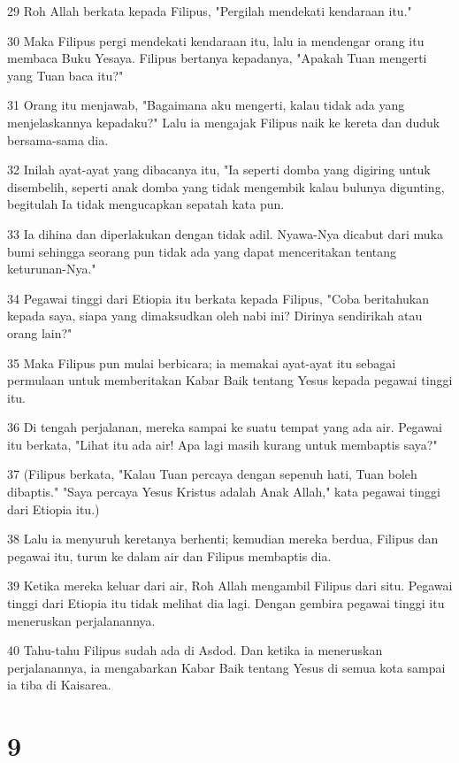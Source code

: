 \par 29 Roh Allah berkata kepada Filipus, "Pergilah mendekati kendaraan itu."
\par 30 Maka Filipus pergi mendekati kendaraan itu, lalu ia mendengar orang itu membaca Buku Yesaya. Filipus bertanya kepadanya, "Apakah Tuan mengerti yang Tuan baca itu?"
\par 31 Orang itu menjawab, "Bagaimana aku mengerti, kalau tidak ada yang menjelaskannya kepadaku?" Lalu ia mengajak Filipus naik ke kereta dan duduk bersama-sama dia.
\par 32 Inilah ayat-ayat yang dibacanya itu, "Ia seperti domba yang digiring untuk disembelih, seperti anak domba yang tidak mengembik kalau bulunya digunting, begitulah Ia tidak mengucapkan sepatah kata pun.
\par 33 Ia dihina dan diperlakukan dengan tidak adil. Nyawa-Nya dicabut dari muka bumi sehingga seorang pun tidak ada yang dapat menceritakan tentang keturunan-Nya."
\par 34 Pegawai tinggi dari Etiopia itu berkata kepada Filipus, "Coba beritahukan kepada saya, siapa yang dimaksudkan oleh nabi ini? Dirinya sendirikah atau orang lain?"
\par 35 Maka Filipus pun mulai berbicara; ia memakai ayat-ayat itu sebagai permulaan untuk memberitakan Kabar Baik tentang Yesus kepada pegawai tinggi itu.
\par 36 Di tengah perjalanan, mereka sampai ke suatu tempat yang ada air. Pegawai itu berkata, "Lihat itu ada air! Apa lagi masih kurang untuk membaptis saya?"
\par 37 (Filipus berkata, "Kalau Tuan percaya dengan sepenuh hati, Tuan boleh dibaptis." "Saya percaya Yesus Kristus adalah Anak Allah," kata pegawai tinggi dari Etiopia itu.)
\par 38 Lalu ia menyuruh keretanya berhenti; kemudian mereka berdua, Filipus dan pegawai itu, turun ke dalam air dan Filipus membaptis dia.
\par 39 Ketika mereka keluar dari air, Roh Allah mengambil Filipus dari situ. Pegawai tinggi dari Etiopia itu tidak melihat dia lagi. Dengan gembira pegawai tinggi itu meneruskan perjalanannya.
\par 40 Tahu-tahu Filipus sudah ada di Asdod. Dan ketika ia meneruskan perjalanannya, ia mengabarkan Kabar Baik tentang Yesus di semua kota sampai ia tiba di Kaisarea.

\chapter{9}


